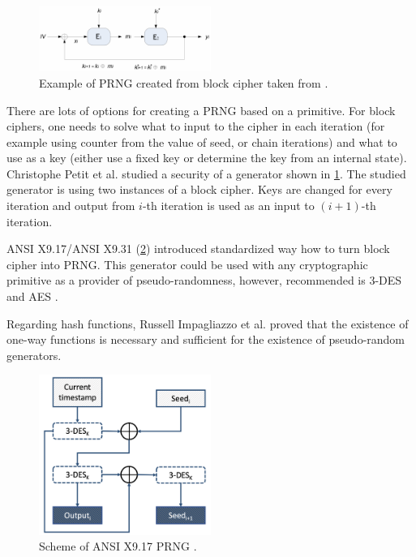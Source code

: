 \documentclass[
    digital,    %
    oneside,    %
    color,
    11pt,
    nocover,
    notable,
    nolof,
    nolot,
    final
]{fithesis3}
\renewcommand\_{\textunderscore\allowbreak}
\begin{document}
\begin{description}
\begin{figure}[h]
	\centering
	\includegraphics[width=0.5\textwidth]{./images/pictures/block-cipher-prng.png}
	\caption{Example of PRNG created from block cipher taken from \cite{Petit:2008:BCB:1368310.1368322}.}
	\label{fig:block-prng}
\end{figure}

There are lots of options for creating a PRNG based on a primitive. For block ciphers, one needs to solve what to input to the cipher in each iteration (for example using counter from the value of seed, or chain iterations) and what to use as a key (either use a fixed key or determine the key from an internal state). Christophe Petit et al. studied \cite{Petit:2008:BCB:1368310.1368322} a security of a generator shown in \cref{fig:block-prng}. The studied generator is using two instances of a block cipher. Keys are changed for every iteration and output from $i$-th iteration is used as an input to $(i + 1)$-th iteration.

ANSI X9.17/ANSI X9.31 (\cref{fig:x9-17}) \cite{ansi1985american} introduced standardized way how to turn block cipher into PRNG. This generator could be used with any cryptographic primitive as a provider of pseudo-randomness, however, recommended is 3-DES and AES \cite{Keller05nist-recommendedrandom}.

Regarding hash functions, Russell Impagliazzo et al. proved \cite{Impagliazzo:1989:PGO:73007.73009} that the existence of one-way functions is necessary and sufficient for the existence of pseudo-random generators. 

\end{description} 


\begin{figure}[h]
	\centering
	\includegraphics[width=0.5\textwidth]{./images/pictures/x9-17-prng.png}
	\caption{Scheme of ANSI X9.17 PRNG \cite{ansi1985american,kelsey1998cryptanalytic}.}
	\label{fig:x9-17}
\end{figure}
\end{document}
